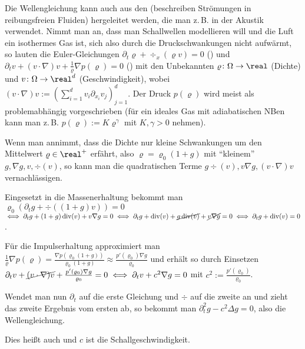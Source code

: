 \begin{Bem}
    Die Wellengleichung kann auch aus den 
    (beschreiben Strömungen in reibungsfreien Fluiden) hergeleitet werden,
    die man z.\,B. in der Akustik verwendet.
    Nimmt man an, dass man Schallwellen modellieren will und die Luft ein isothermes Gas ist,
    sich also durch die Druckschwankungen nicht aufwärmt, so lauten die Euler-Gleichungen
    $\partial_t \varrho + \div_x(\varrho v) = 0$ () und
    $\partial_t v + (v \cdot \nabla) v + \frac{1}{\varrho} \nabla p(\varrho) = 0$
    ()
    mit den Unbekannten $\varrho\colon \Omega \to \real$ (Dichte) und
    $v\colon \Omega \to \real^d$ (Geschwindigkeit),
    wobei\\
    $(v \cdot \nabla) v := (\sum_{i=1}^d v_i \partial_{x_i} v_j)_{j=1}^d$.
    Der Druck $p(\varrho)$ wird meist als  problemabhängig
    vorgeschrieben (für ein ideales Gas mit adiabatischen NBen kann man z.\,B.
    $p(\varrho) := K \varrho^\gamma$ mit $K, \gamma > 0$ nehmen).

    Wenn man annimmt, dass die Dichte nur kleine Schwankungen um den Mittelwert
    $\varrho \in \real^+$ erfährt, also $\varrho = \varrho_0 (1 + g)$ mit "`kleinem"'
    $g, \nabla g, v, \div(v)$, so kann man die quadratischen Terme
    $g\div(v), v \nabla g, (v \cdot \nabla) v$ vernachlässigen.

    Eingesetzt in die Massenerhaltung bekommt man
    $\varrho_0 (\partial_t g + \div((1 + g) v)) = 0$\\
    $\iff \partial_t g + (1 + g) \div(v) + v \nabla g = 0
    \iff \partial_t g + \div(v) + \cancel{g \div(v)} + \cancel{v \nabla g} = 0
    \iff \partial_t g + \div(v) = 0$.

    Für die Impulserhaltung approximiert man
    $\frac{1}{\varrho} \nabla p(\varrho)
    = \frac{\nabla p(\varrho_0 (1 + g))}{\varrho_0 (1 + g)}
    \approx \frac{p'(\varrho_0) \nabla g}{\varrho_0}$
    und erhält so durch Einsetzen
    $\partial_t v + \cancel{(v \cdot \nabla) v} + \frac{p'(\varrho_0) \nabla g}{\varrho_0}
    = 0 \iff \partial_t v + c^2 \nabla g = 0$ mit $c^2 := \frac{p'(\varrho_0)}{\varrho_0}$.

    Wendet man nun $\partial_t$ auf die erste Gleichung und $\div$ auf die zweite an
    und zieht das zweite Ergebnis vom ersten ab, so bekommt man
    $\partial_t^2 g - c^2 \Delta g = 0$,
    also die Wellengleichung.

    Dies heißt auch 
    und $c$ ist die Schallgeschwindigkeit.
\end{Bem}


